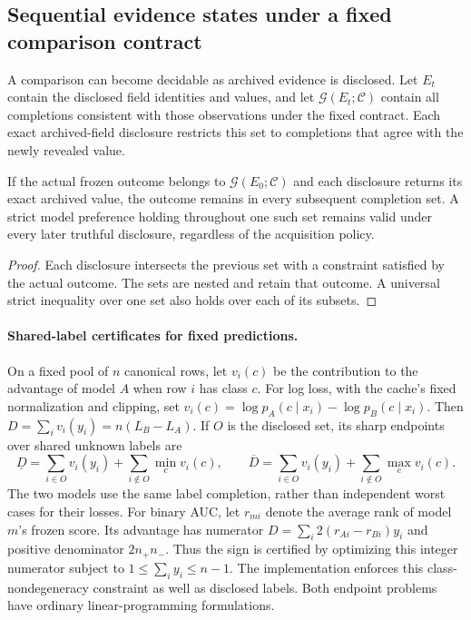 \subsection{Sequential evidence states under a fixed comparison contract}\label{subsec:sequential}
A comparison can become decidable as archived evidence is disclosed. Let $E_t$ contain the disclosed field identities and values, and let $\mathcal G(E_t;\mathcal C)$ contain all completions consistent with those observations under the fixed contract. Each exact archived-field disclosure restricts this set to completions that agree with the newly revealed value.

\begin{proposition}\label{prop:disclosure}
If the actual frozen outcome belongs to $\mathcal G(E_0;\mathcal C)$ and each disclosure returns its exact archived value, the outcome remains in every subsequent completion set. A strict model preference holding throughout one such set remains valid under every later truthful disclosure, regardless of the acquisition policy.
\end{proposition}
\begin{proof}
Each disclosure intersects the previous set with a constraint satisfied by the actual outcome. The sets are nested and retain that outcome. A universal strict inequality over one set also holds over each of its subsets.
\end{proof}

\paragraph{Shared-label certificates for fixed predictions.}
On a fixed pool of $n$ canonical rows, let $v_i(c)$ be the contribution to the advantage of model $A$ when row $i$ has class $c$. For log loss, with the cache's fixed normalization and clipping, set $v_i(c)=\log p_A(c\mid x_i)-\log p_B(c\mid x_i)$. Then $D=\sum_i v_i(y_i)=n(L_B-L_A)$. If $O$ is the disclosed set, its sharp endpoints over shared unknown labels are
\[
 \underline D=\sum_{i\in O}v_i(y_i)+\sum_{i\notin O}\min_c v_i(c),\qquad
 \overline D=\sum_{i\in O}v_i(y_i)+\sum_{i\notin O}\max_c v_i(c).
\]
The two models use the same label completion, rather than independent worst cases for their losses. For binary AUC, let $r_{mi}$ denote the average rank of model $m$'s frozen score. Its advantage has numerator $D=\sum_i 2(r_{Ai}-r_{Bi})y_i$ and positive denominator $2n_+n_-$. Thus the sign is certified by optimizing this integer numerator subject to $1\leq\sum_i y_i\leq n-1$. The implementation enforces this class-nondegeneracy constraint as well as disclosed labels. Both endpoint problems have ordinary linear-programming formulations.

